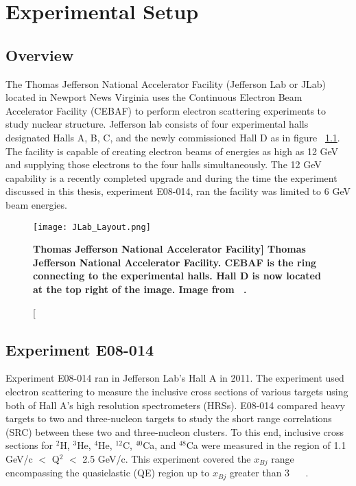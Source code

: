 \chapter{Experimental Setup} %
\label{ch:experiment} %

\section{Overview}
\label{sec:overview}

The Thomas Jefferson National Accelerator Facility (Jefferson Lab or JLab) located in Newport News Virginia uses the Continuous Electron Beam Accelerator Facility (CEBAF) to perform electron scattering experiments to study nuclear structure. Jefferson lab consists of four experimental halls designated Halls A, B, C, and the newly commissioned Hall D as in figure ~\ref{fig:jlab}. The facility is capable of creating electron beams of energies as high as 12 GeV and supplying those electrons to the four halls simultaneously. The 12 GeV capability is a recently completed upgrade and during the time the experiment discussed in this thesis, experiment E08-014, ran the facility was limited to 6 GeV beam energies.  

\begin{figure}[!ht]
\begin{center}
\texttt{[image: JLab\_Layout.png]}
\end{center}
\caption[\bf{Thomas Jefferson National Accelerator Facility}]{
{\bf{Thomas Jefferson National Accelerator Facility.}} CEBAF is the ring connecting to the experimental halls. Hall D is now located at the top right of the image. Image from ~\cite{Article:HallA}.}
\label{fig:jlab}
\end{figure}

\section{Experiment E08-014}
\label{sec:x>2}
Experiment E08-014 ran in Jefferson Lab's Hall A in 2011. The experiment used electron scattering to measure the inclusive cross sections of various targets using both of Hall A's high resolution spectrometers (HRSs). E08-014 compared heavy targets to two and three-nucleon targets to study the short range correlations (SRC) between these two and three-nucleon clusters. To this end, inclusive cross sections for $^2$H, $^3$He, $^4$He, $^{12}$C, $^{40}$Ca, and $^{48}$Ca were measured in the region of 1.1 GeV/c $<$ Q$^2$ $<$ 2.5 GeV/c. This experiment covered the $x_{Bj}$ range encompassing the quasielastic (QE) region up to $x_{Bj}$ greater than 3 ~\cite{Thesis:Ye} ~\cite{src_website}. 

